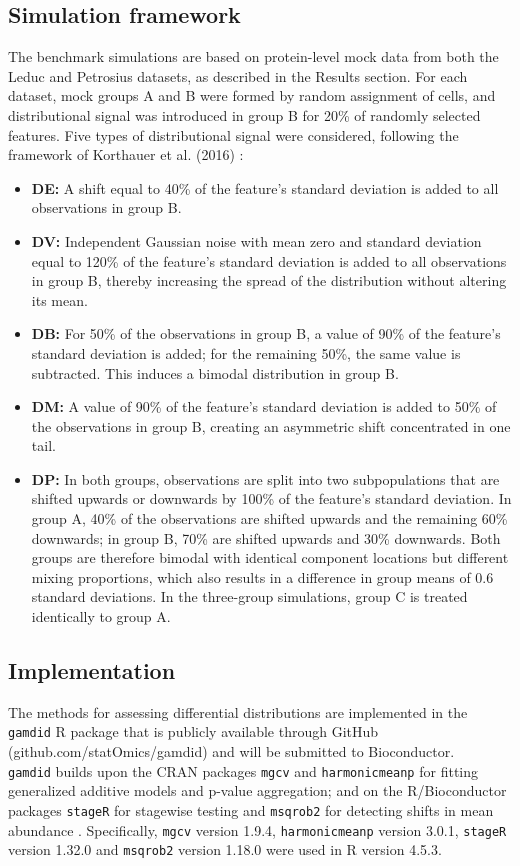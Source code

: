 \subsection{Simulation framework}
The benchmark simulations are based on protein-level mock data from both the Leduc and Petrosius datasets, as described in the Results section. For each dataset, mock groups A and B were formed by random assignment of cells, and distributional signal was introduced in group B for 20\% of randomly selected features. Five types of distributional signal were considered, following the framework of Korthauer et al. (2016) \cite{scdd}:
\begin{itemize}
    \item \textbf{DE:} A shift equal to 40\% of the feature's standard deviation is added to all observations in group B.
    \item \textbf{DV:} Independent Gaussian noise with mean zero and standard deviation equal to 120\% of the feature's standard deviation is added to all observations in group B, thereby increasing the spread of the distribution without altering its mean.
    \item \textbf{DB:} For 50\% of the observations in group B, a value of 90\% of the feature's standard deviation is added; for the remaining 50\%, the same value is subtracted. This induces a bimodal distribution in group B.
    \item \textbf{DM:} A value of 90\% of the feature's standard deviation is added to 50\% of the observations in group B, creating an asymmetric shift concentrated in one tail.
    \item \textbf{DP:} In both groups, observations are split into two subpopulations that are shifted upwards or downwards by 100\% of the feature's standard deviation. In group A, 40\% of the observations are shifted upwards and the remaining 60\% downwards; in group B, 70\% are shifted upwards and 30\% downwards. Both groups are therefore bimodal with identical component locations but different mixing proportions, which also results in a difference in group means of 0.6 standard deviations. In the three-group simulations, group C is treated identically to group A.
\end{itemize}


\subsection{Implementation}
The methods for assessing differential distributions are implemented in the \texttt{gamdid} R package that is publicly available through GitHub (github.com/statOmics/gamdid) and will be submitted to Bioconductor.\\
\texttt{gamdid} builds upon the CRAN packages \texttt{mgcv} \cite{mgcv} and \texttt{harmonicmeanp} \cite{hmp_package} for fitting generalized additive models and p-value aggregation; and on the R/Bioconductor packages \texttt{stageR} \cite{stager} for stagewise testing and \texttt{msqrob2} for detecting shifts in mean abundance \cite{msqrob}. Specifically, \texttt{mgcv} version 1.9.4, \texttt{harmonicmeanp} version 3.0.1, \texttt{stageR} version 1.32.0 and \texttt{msqrob2} version 1.18.0 were used in R version 4.5.3.
